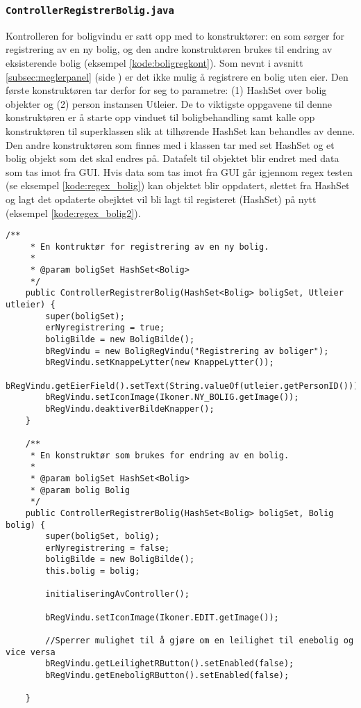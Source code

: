 \subsubsection*{\texttt{ControllerRegistrerBolig.java}}
Kontrolleren for boligvindu er satt opp med to konstruktører: en som sørger for registrering av en ny bolig, og den andre konstruktøren brukes til endring av eksisterende bolig (eksempel \ref{kode:boligregkont}). 
Som nevnt i avsnitt \ref{subsec:meglerpanel} (side \pageref{subsec:meglerpanel}) er det ikke mulig å registrere en bolig uten eier. Den første konstruktøren tar derfor for seg to parametre: (1) HashSet over bolig objekter og (2) person instansen Utleier. De to viktigste oppgavene til denne konstruktøren er å starte opp vinduet til boligbehandling samt kalle opp konstruktøren til superklassen slik at tilhørende HashSet kan behandles av denne. 
Den andre konstruktøren som finnes med i klassen tar med set HashSet og et bolig objekt som det skal endres på. Datafelt til objektet blir endret med data som tas imot fra GUI. Hvis data som tas imot fra GUI går igjennom regex testen (se eksempel \ref{kode:regex_bolig}) kan objektet blir oppdatert, slettet fra HashSet og lagt det opdaterte obejktet vil bli lagt til registeret (HashSet) på nytt (eksempel \ref{kode:regex_bolig2}). 



\begin{lstlisting}[caption=\texttt{ControllerRegistrerBolig.java}: Oversikt over konstruktører i bolig registrering/endring kontrolleren., label=kode:boligregkont]
    /**
     * En kontruktør for registrering av en ny bolig.
     *
     * @param boligSet HashSet<Bolig>
     */
    public ControllerRegistrerBolig(HashSet<Bolig> boligSet, Utleier utleier) {
        super(boligSet);
        erNyregistrering = true;
        boligBilde = new BoligBilde();
        bRegVindu = new BoligRegVindu("Registrering av boliger");
        bRegVindu.setKnappeLytter(new KnappeLytter());
        bRegVindu.getEierField().setText(String.valueOf(utleier.getPersonID()));
        bRegVindu.setIconImage(Ikoner.NY_BOLIG.getImage());
        bRegVindu.deaktiverBildeKnapper();
    }

    /**
     * En konstruktør som brukes for endring av en bolig.
     *
     * @param boligSet HashSet<Bolig>
     * @param bolig Bolig
     */
    public ControllerRegistrerBolig(HashSet<Bolig> boligSet, Bolig bolig) {
        super(boligSet, bolig);
        erNyregistrering = false;
        boligBilde = new BoligBilde();
        this.bolig = bolig;

        initialiseringAvController();

        bRegVindu.setIconImage(Ikoner.EDIT.getImage());
        
        //Sperrer mulighet til å gjøre om en leilighet til enebolig og vice versa
        bRegVindu.getLeilighetRButton().setEnabled(false);
        bRegVindu.getEneboligRButton().setEnabled(false);

    }
\end{lstlisting}



